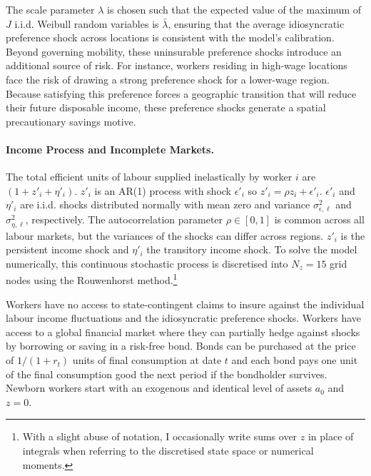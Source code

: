 \documentclass[11pt, a4paper]{article}
\begin{document}
The scale parameter $\lambda$ is chosen such that the expected value of the maximum of $J$ i.i.d. Weibull random variables is $\bar{\lambda}$, ensuring that the average idiosyncratic preference shock across locations is consistent with the model's calibration. Beyond governing mobility, these uninsurable preference shocks introduce an additional source of risk. For instance, workers residing in high-wage locations face the risk of drawing a strong preference shock for a lower-wage region. Because satisfying this preference forces a geographic transition that will reduce their future disposable income, these preference shocks generate a spatial precautionary savings motive.

\paragraph{Income Process and Incomplete Markets.} The total efficient units of labour supplied inelastically by worker $i$ are $(1 + z'_i + \eta'_i)$. $z'_i$ is an AR(1) process with shock $\epsilon'_i$ so $z'_i = \rho z_i + \epsilon'_i$. $\epsilon'_i$ and $\eta'_i$ are i.i.d. shocks distributed normally with mean zero and variance $\sigma^2_{\epsilon, \ell}$ and $\sigma^2_{\eta, \ell}$, respectively. The autocorrelation parameter $\rho \in [0,1]$ is common across all labour markets, but the variances of the shocks can differ across regions. $z'_i$ is the persistent income shock and $\eta'_i$ the transitory income shock. To solve the model numerically, this continuous stochastic process is discretised into $N_z = 15$ grid nodes using the Rouwenhorst method.\footnote{With a slight abuse of notation, I occasionally write sums over $z$ in place of integrals when referring to the discretised state space or numerical moments.}

Workers have no access to state-contingent claims to insure against the individual labour income fluctuations and the idiosyncratic preference shocks. Workers have access to a global financial market where they can partially hedge against shocks by borrowing or saving in a risk-free bond. Bonds can be purchased at the price of $1/(1 + r_t)$ units of final consumption at date $t$ and each bond pays one unit of the final consumption good the next period if the bondholder survives. Newborn workers start with an exogenous and identical level of assets $a_0$ and $z = 0$.
\end{document}
